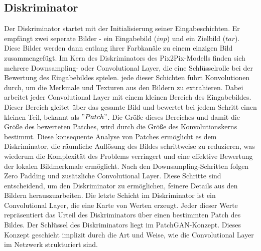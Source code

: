 \subsection{Diskriminator}
Der Diskriminator startet mit der Initialisierung seiner Eingabeschichten. Er empfängt zwei seperate Bilder - ein Eingabebild ($inp$) und ein Zielbild ($tar$). Diese Bilder werden dann entlang ihrer Farbkanäle zu einem einzigen Bild zusammengefügt.\newline
Im Kern des Diskriminators des Pix2Pix-Modells finden sich mehrere Downsampling- oder Convolutional Layer, die eine Schlüsselrolle bei der Bewertung des Eingabebildes spielen. jede dieser Schichten führt Konvolutionen durch, um die Merkmale und Texturen aus den Bildern zu extrahieren. Dabei arbeitet jeder Convolutional Layer mit einem kleinen Bereich des Eingabebildes. Dieser Bereich gleitet über das gesamte Bild und bewertet bei jedem Schritt einen kleinen Teil, bekannt als $"Patch"$. Die Größe dieses Bereiches und damit die Größe des bewerteten Patches, wird durch die Größe des Konvolutionskerns bestimmt. Diese konsequente Analyse von Patches ermöglicht es dem Diskriminator, die räumliche Auflösung des Bildes schrittweise zu reduzieren, was wiederum die Komplexität des Problems verringert und eine effektive Bewertung der lokalen Bildmerkmale ermöglicht. \newline
Nach den Downsampling-Schritten folgen Zero Padding und zusätzliche Convolutional Layer. Diese Schritte sind entscheidend, um den Diskriminator zu ermöglichen, feinere Details aus den Bildern herauszuarbeiten. \newline
Die letzte Schicht im Diskriminator ist ein Convolutional Layer, die eine Karte von Werten erzeugt. Jeder dieser Werte repräsentiert das Urteil des Diskriminators über einen bestimmten Patch des Bildes.\newline
Der Schlüssel des Diskriminators liegt im PatchGAN-Konzept. Dieses Konzept geschieht implizit durch die Art und Weise, wie die Convolutional Layer im Netzwerk strukturiert sind.
\newpage
